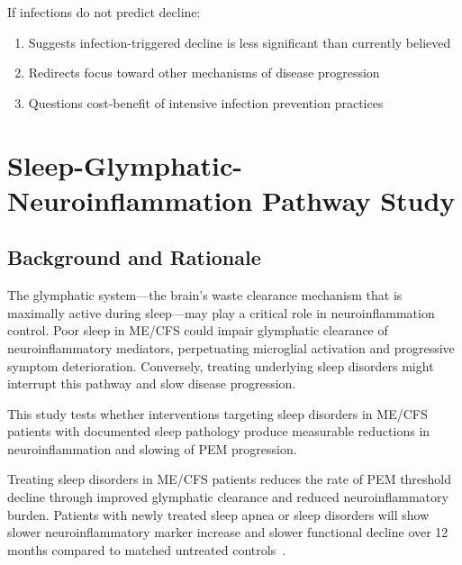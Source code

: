 If infections do not predict decline:
\begin{enumerate}
    \item Suggests infection-triggered decline is less significant than currently believed
    \item Redirects focus toward other mechanisms of disease progression
    \item Questions cost-benefit of intensive infection prevention practices
\end{enumerate}

\section{Sleep-Glymphatic-Neuroinflammation Pathway Study}
\label{sec:sleep-glymphatic-study}

\subsection{Background and Rationale}

The glymphatic system---the brain's waste clearance mechanism that is maximally active during sleep---may play a critical role in neuroinflammation control. Poor sleep in ME/CFS could impair glymphatic clearance of neuroinflammatory mediators, perpetuating microglial activation and progressive symptom deterioration. Conversely, treating underlying sleep disorders might interrupt this pathway and slow disease progression.

This study tests whether interventions targeting sleep disorders in ME/CFS patients with documented sleep pathology produce measurable reductions in neuroinflammation and slowing of PEM progression.

\begin{hypothesis}
\label{hyp:sleep-glymphatic-pem}
Treating sleep disorders in ME/CFS patients reduces the rate of PEM threshold decline through improved glymphatic clearance and reduced neuroinflammatory burden. Patients with newly treated sleep apnea or sleep disorders will show slower neuroinflammatory marker increase and slower functional decline over 12 months compared to matched untreated controls~\cite{Nakatomi2014neuroinflammation}.
\end{hypothesis}

